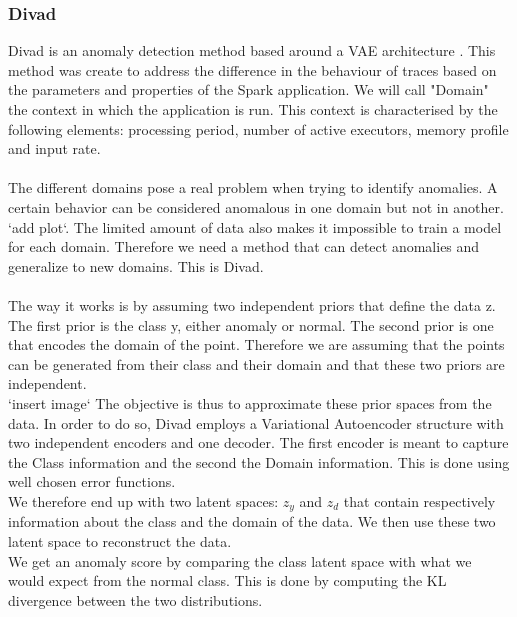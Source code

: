 \documentclass[oneside, a4paper, onecolumn, 11pt]{article}
\begin{document}
\subsubsection{Divad}
\label{subsec:divad_domain}
Divad is an anomaly detection method based around a VAE architecture \cite{Divad}. This method was create to address the difference in the behaviour of traces based on the parameters and properties of the Spark application. We will call "Domain" the context in which the application is run. This context is characterised by the following elements: processing period, number of active executors, memory profile and input rate.\\\\
The different domains pose a real problem when trying to identify anomalies. A certain behavior can be considered anomalous in one domain but not in another. `add plot`.
The limited amount of data also makes it impossible to train a model for each domain. Therefore we need a method that can detect anomalies and generalize to new domains. This is Divad.\\\\
The way it works is by assuming two independent priors that define the data z. The first prior is the class y, either anomaly or normal. The second prior is one that encodes the domain of the point. Therefore we are assuming that the points can be generated from their class and their domain and that these two priors are independent.\\
`insert image`
The objective is thus to approximate these prior spaces from the data. In order to do so, Divad employs a Variational Autoencoder structure with two independent encoders and one decoder. The first encoder is meant to capture the Class information and the second the Domain information. This is done using well chosen error functions.\\
We therefore end up with two latent spaces: $z_y$ and $z_d$ that contain respectively information about the class and the domain of the data. We then use these two latent space to reconstruct the data.\\
We get an anomaly score by comparing the class latent space with what we would expect from the normal class. This is done by computing the KL divergence between the two distributions.\\
\end{document}
